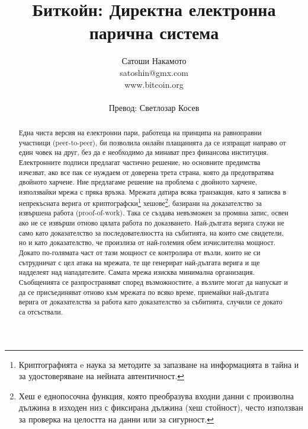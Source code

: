 \documentclass[11pt,a4paper]{article}
\title{\textbf{Биткойн: Директна електронна парична система}}
\author{Сатоши Накамото\\
\small satoshin@gmx.com\\
\small www.bitcoin.org\\
\\
\small Превод: Светлозар Косев}
\date{}
\begin{document}
\maketitle

\begin{abstract}
Една чиста версия на електронни пари, работеща на принципа на равноправни участници (peer-to-peer), би позволила онлайн плащанията да се изпращат направо от един човек на друг, без да е необходимо да минават през финансова институция. Електронните подписи предлагат частично решение, но основните предимства изчезват, ако все пак се нуждаем от доверена трета страна, която да предотвратява двойното харчене. Ние предлагаме решение на проблема с двойното харчене, използвайки мрежа с пряка връзка. Мрежата датира всяка транзакция, като я записва в непрекъсната верига от криптографски\footnote{Криптографията e наука за методите за запазване на информацията в тайна и за удостоверяване на нейната автентичност.} хешове\footnote{Хеш е еднопосочна функция, която преобразува входни данни с произволна дължина в изходен низ с фиксирана дължина (хеш стойност), често използван за проверка на целостта на данни или за сигурност.}, базирани на доказателство за извършена работа (proof-of-work). Така се създава невъзможен за промяна запис, освен ако не се извърши отново цялата работа по доказването. Най-дългата верига служи не само като доказателство за последователността на събитията, на които сме свидетели, но и като доказателство, че произлиза от най-големия обем изчислителна мощност. Докато по-голямата част от тази мощност се контролира от възли, които не си сътрудничат с цел атака на мрежата, те ще генерират най-дългата верига и ще надделеят над нападателите. Самата мрежа изисква минимална организация. Съобщенията се разпространяват според възможностите, а възлите могат да напускат и да се присъединяват отново към мрежата по всяко време, приемайки най-дългата верига от доказателства за работа като доказателство за събитията, случили се докато са отсъствали.
\end{abstract}
\end{document}

